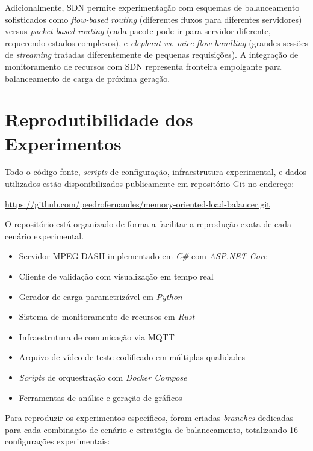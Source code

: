 Adicionalmente, SDN permite experimentação com esquemas de balanceamento sofisticados como \textit{flow-based routing} (diferentes fluxos para diferentes servidores) versus \textit{packet-based routing} (cada pacote pode ir para servidor diferente, requerendo estados complexos), e \textit{elephant vs. mice flow handling} (grandes sessões de \textit{streaming} tratadas diferentemente de pequenas requisições). A integração de monitoramento de recursos com SDN representa fronteira empolgante para balanceamento de carga de próxima geração.

\section{Reprodutibilidade dos Experimentos}

Todo o código-fonte, \textit{scripts} de configuração, infraestrutura experimental, e dados utilizados estão disponibilizados publicamente em repositório Git no endereço:

\begin{center}
\url{https://github.com/peedrofernandes/memory-oriented-load-balancer.git}
\end{center}

O repositório está organizado de forma a facilitar a reprodução exata de cada cenário experimental.

\begin{itemize}
    \item Servidor MPEG-DASH implementado em \textit{C\#} com \textit{ASP.NET Core}
    \item Cliente de validação com visualização em tempo real
    \item Gerador de carga parametrizável em \textit{Python}
    \item Sistema de monitoramento de recursos em \textit{Rust}
    \item Infraestrutura de comunicação via MQTT
    \item Arquivo de vídeo de teste codificado em múltiplas qualidades
    \item \textit{Scripts} de orquestração com \textit{Docker Compose}
    \item Ferramentas de análise e geração de gráficos
\end{itemize}

Para reproduzir os experimentos específicos, foram criadas \textit{branches} dedicadas para cada combinação de cenário e estratégia de balanceamento, totalizando 16 configurações experimentais:

